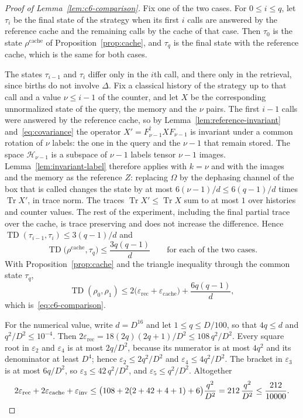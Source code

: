 \documentclass[11pt,letterpaper]{article}
\theoremstyle{definition}\newtheorem{definition}[theorem]{Definition}
\newcommand{\Tr}{\operatorname{Tr}}
\newcommand{\TD}{\operatorname{TD}}
\begin{document}
\begin{proof}[Proof of Lemma~\ref{lem:c6-comparison}]
Fix one of the two cases. For $0\le i\le q$, let $\tau_i$ be the final
state of the strategy when its first $i$ calls are answered by the
reference cache and the remaining calls by the cache of that case. Then
$\tau_0$ is the state $\rho^{\mathrm{cache}}$ of
Proposition~\ref{prop:cache}, and $\tau_q$ is the final state with the
reference cache, which is the same for both cases.

The states $\tau_{i-1}$ and $\tau_i$ differ only in the $i$th call, and
there only in the retrieval, since births do not involve $\Delta$. Fix
a classical history of the strategy up to that call and a value
$\nu\le i-1$ of the counter, and let $X$ be the corresponding
unnormalized state of the query, the memory and the $\nu$ pairs. The
first $i-1$ calls were answered by the reference cache, so by
Lemma~\ref{lem:reference-invariant} and~\eqref{eq:covariance} the
operator $X'=F_{\nu-1}^\dagger XF_{\nu-1}$ is invariant under a common
rotation of $\nu$ labels: the one in the query and the $\nu-1$ that
remain stored. The space $\mathcal H_{\nu-1}$ is a subspace of
$\nu-1$ labels tensor $\nu-1$ images. Lemma~\ref{lem:invariant-label}
therefore applies with $k=\nu$ and with the images and the memory as
the reference $Z$: replacing $\Omega$ by the dephasing channel of the
box that is called changes the state by at most
$6(\nu-1)/d\le6(q-1)/d$ times $\Tr X'$, in trace norm. The traces
$\Tr X'\le\Tr X$ sum to at most $1$ over histories and counter values.
The rest of the experiment, including the final partial trace over the
cache, is trace preserving and does not increase the difference. Hence
$\TD(\tau_{i-1},\tau_i)\le3(q-1)/d$ and
\[
 \TD\bigl(\rho^{\mathrm{cache}},\tau_q\bigr)\le\frac{3q(q-1)}d
 \qquad\text{for each of the two cases.}
\]
With Proposition~\ref{prop:cache} and the triangle inequality through
the common state $\tau_q$,
\[
 \TD(\rho_0,\rho_1)
 \le2\bigl(\varepsilon_{\mathrm{rec}}+\varepsilon_{\mathrm{cache}}\bigr)
 +\frac{6q(q-1)}d ,
\]
which is~\eqref{eq:c6-comparison}.

For the numerical value, write $d=D^{16}$ and let $1\le q\le D/100$, so
that $4q\le d$ and $q^2/D^2\le10^{-4}$. Then
$2\varepsilon_{\mathrm{rec}}=18(2q)(2q+1)/D^2\le108\,q^2/D^2$. Every
square root in $\varepsilon_2$ and $\varepsilon_4$ is at most $2q/D^2$,
because its numerator is at most $4q^2$ and its denominator at least
$D^4$; hence $\varepsilon_2\le2q^2/D^2$ and
$\varepsilon_4\le4q^2/D^2$. The bracket in
$\varepsilon_3$ is at most $6q/D^2$, so $\varepsilon_3\le42\,q^2/D^2$,
and $\varepsilon_5\le q^2/D^2$. Altogether
\[
 2\varepsilon_{\mathrm{rec}}+2\varepsilon_{\mathrm{cache}}
 +\varepsilon_{\mathrm{inv}}
 \le\bigl(108+2(2+42+4+1)+6\bigr)\frac{q^2}{D^2}
 =212\,\frac{q^2}{D^2}\le\frac{212}{10000}. \qedhere
\]
\end{proof}
\end{document}
